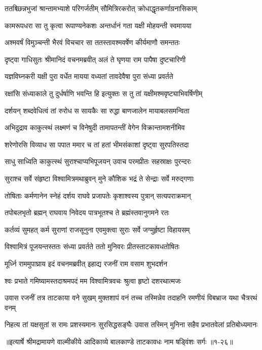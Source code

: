 \twolineshloka
{ततश्च्छिन्नभुजां श्रान्तामभ्याशे परिगर्जतीम्}
{सौमित्रिरकरोत् क्रोधाद्धृतकर्णाग्रनासिकाम्} %

\twolineshloka
{कामरूपधरा सा तु कृत्वा रूपाण्यनेकशः}
{अन्तर्धानं गता यक्षी मोहयन्ती स्वमायया} %

\twolineshloka
{अश्मवर्षं विमुञ्चन्ती भैरवं विचचार सा}
{ततस्तावश्मवर्षेण कीर्यमाणौ समन्ततः} %

\twolineshloka
{दृष्ट्वा गाधिसुतः श्रीमानिदं वचनमब्रवीत्}
{अलं ते घृणया राम पापैषा दुष्टचारिणी} %

\twolineshloka
{यज्ञविघ्नकरी यक्षी पुरा वर्धेत मायया}
{वध्यतां तावदेवैषा पुरा संध्या प्रवर्तते} %

\twolineshloka
{रक्षांसि संध्याकाले तु दुर्धर्षाणि भवन्ति हि}
{इत्युक्तः स तु तां यक्षीमश्मवृष्ट्याभिवर्षिणीम्} %

\twolineshloka
{दर्शयन् शब्दवेधित्वं तां रुरोध स सायकैः}
{सा रुद्धा बाणजालेन मायाबलसमन्विता} %

\twolineshloka
{अभिदुद्राव काकुत्स्थं लक्ष्मणं च विनेषुदी}
{तामापतन्तीं वेगेन विक्रान्तामशनीमिव} %

\twolineshloka
{शरेणोरसि विव्याध सा पपात ममार च}
{तां हतां भीमसंकाशां दृष्ट्वा सुरपतिस्तदा} %

\twolineshloka
{साधु साध्विति काकुत्स्थं सुराश्चाप्यभिपूजयन्}
{उवाच परमप्रीतः सहस्राक्षः पुरन्दरः} %

\twolineshloka
{सुराश्च सर्वे संहृष्टा विश्वामित्रमथाब्रुवन्}
{मुने कौशिक भद्रं ते सेन्द्राः सर्वे मरुद्गणाः} %

\twolineshloka
{तोषिताः कर्मणानेन स्नेहं दर्शय राघवे}
{प्रजापतेः कृशाश्वस्य पुत्रान् सत्यपराक्रमान्} %

\twolineshloka
{तपोबलभृतो ब्रह्मन् राघवाय निवेदय}
{पात्रभूतश्च ते ब्रह्मंस्तवानुगमने रतः} %

\twolineshloka
{कर्तव्यं सुमहत् कर्म सुराणां राजसूनुना}
{एवमुक्त्वा सुराः सर्वे जग्मुर्हृष्टा विहायसम्} %

\twolineshloka
{विश्वामित्रं पूजयन्तस्ततः संध्या प्रवर्तते}
{ततो मुनिवरः प्रीतस्ताटकावधतोषितः} %

\twolineshloka
{मूर्ध्नि राममुपाघ्राय इदं वचनमब्रवीत्}
{इहाद्य रजनीं राम वसाम शुभदर्शन} %

\twolineshloka
{श्वः प्रभाते गमिष्यामस्तदाश्रमपदं मम}
{विश्वामित्रवचः श्रुत्वा हृष्टो दशरथात्मजः} %

\threelineshloka
{उवास रजनीं तत्र ताटकाया वने सुखम्}
{मुक्तशापं वनं तच्च तस्मिन्नेव तदाहनि}
{रमणीयं विबभ्राज यथा चैत्ररथं वनम्} %

\twolineshloka
{निहत्य तां यक्षसुतां स रामः प्रशस्यमानः सुरसिद्धसङ्घैः}
{उवास तस्मिन् मुनिना सहैव प्रभातवेलां प्रतिबोध्यमानः} %


॥इत्यार्षे श्रीमद्रामायणे वाल्मीकीये आदिकाव्ये बालकाण्डे ताटकावधः नाम षड्विंशः सर्गः ॥१-२६॥
